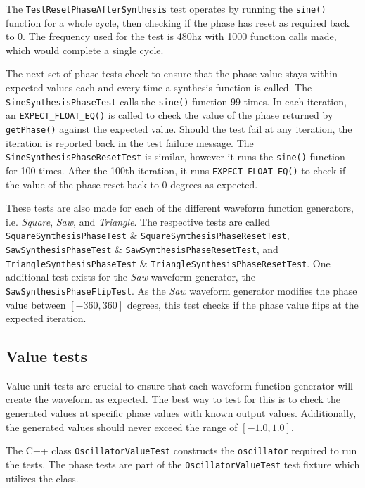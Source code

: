 \documentclass[a4paper,12pt]{report}
\begin{document}
The \texttt{Test\-Reset\-Phase\-After\-Synthesis} test operates by running the \texttt{sine()} function for a whole cycle, then checking if the phase has reset as required back to 0. The frequency used for the test is 480hz with 1000 function calls made, which would complete a single cycle.

The next set of phase tests check to ensure that the phase value stays within expected values each and every time a synthesis function is called. The \texttt{Sine\-Synthesis\-Phase\-Test} calls the \texttt{sine()} function 99 times. In each iteration, an \texttt{EXPECT\_FLOAT\_EQ()} is called to check the value of the phase returned by \texttt{getPhase()} against the expected value. Should the test fail at any iteration, the iteration is reported back in the test failure message. The \texttt{Sine\-Synthesis\-Phase\-Reset\-Test} is similar, however it runs the \texttt{sine()} function for 100 times. After the 100th iteration, it runs \texttt{EXPECT\-\_FLOAT\-\_EQ()} to check if the value of the phase reset back to 0 degrees as expected.

These tests are also made for each of the different waveform function generators, i.e. \emph{Square}, \emph{Saw}, and \emph{Triangle}. The respective tests are called \texttt{Square\-Synthesis\-Phase\-Test} \& \texttt{Square\-Synthesis\-Phase\-Reset\-Test}, \texttt{Saw\-Synthesis\-Phase\-Test} \& \texttt{Saw\-Synthesis\-Phase\-Reset\-Test}, and \texttt{Triangle\-Synthesis\-Phase\-Test} \& \texttt{Triangle\-Synthesis\-Phase\-Reset\-Test}. One additional test exists for the \emph{Saw} waveform generator, the \texttt{Saw\-Synthesis\-Phase\-Flip\-Test}. As the \emph{Saw} waveform generator modifies the phase value between $[-360,360]$ degrees, this test checks if the phase value flips at the expected iteration.

\subsection{Value tests}
\label{subsec:valuetests}
Value unit tests are crucial to ensure that each waveform function generator will create the waveform as expected. The best way to test for this is to check the generated values at specific phase values with known output values. Additionally, the generated values should never exceed the range of $[-1.0,1.0]$.

The C++ class \texttt{Oscillator\-Value\-Test} constructs the \texttt{oscillator} required to run the tests. The phase tests are part of the \texttt{Oscillator\-Value\-Test} test fixture which utilizes the class.
\end{document}
